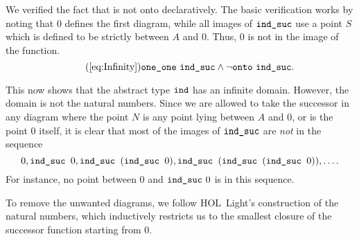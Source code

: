 We verified the fact that  is not onto declaratively. The basic verification works by noting that $0$ defines the first diagram, while all images of $\texttt{ind\_suc}$ use a point $S$ which is defined to be strictly between $A$ and $0$. Thus, $0$ is not in the image of the function.
\begin{equation}
\tag{\ref{eq:Infinity}}
\code{one\_one}\ \code{ind\_suc} \wedge \neg\code{onto}\ \code{ind\_suc}.
\end{equation}

This now shows that the abstract type $\texttt{ind}$ has an infinite domain. However, the domain is not the natural numbers. Since we are allowed to take the successor in any diagram where the point $N$ is any point lying between $A$ and $0$, or is the point $0$ itself, it is clear that most of the images of $\texttt{ind\_suc}$ are \emph{not} in the sequence
\begin{displaymath}
0, \texttt{ind\_suc } 0, \texttt{ind\_suc }(\texttt{ind\_suc } 0), \texttt{ind\_suc }(\texttt{ind\_suc }(\texttt{ind\_suc } 0)),  \ldots.
\end{displaymath}
For instance, no point between $0$ and $\texttt{ind\_suc}\ 0$ is in this sequence.

To remove the unwanted diagrams, we follow HOL~Light's construction of the natural numbers, which inductively restricts us to the smallest closure of the successor function starting from $0$. 




